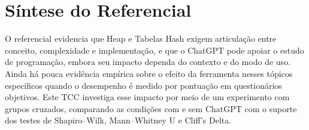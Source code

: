 \section{Síntese do Referencial}
\label{sec:sintese-referencial}

O referencial evidencia que Heap e Tabelas Hash exigem articulação entre conceito, complexidade e implementação, e que o ChatGPT pode apoiar o estudo de programação, embora seu impacto dependa do contexto e do modo de uso. Ainda há pouca evidência empírica sobre o efeito da ferramenta nesses tópicos específicos quando o desempenho é medido por pontuação em questionários objetivos. Este TCC investiga esse impacto por meio de um experimento com grupos cruzados, comparando as condições com e sem ChatGPT com o suporte dos testes de Shapiro--Wilk, Mann--Whitney U e Cliff's Delta.
